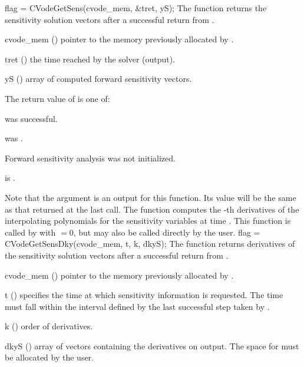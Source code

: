 {
  flag = CVodeGetSens(cvode\_mem, \&tret, yS);
}
{
  The function  returns the sensitivity solution vectors after a
  successful return from .
}
{
  \begin{args}
  \item[cvode\_mem] ()
    pointer to the memory previously allocated by .
  \item[tret] ()
    the time reached by the solver (output).
  \item[yS] ()
    array of computed forward sensitivity vectors.
  \end{args}
}
{
  The return value  of  is one of:
  \begin{args}
  \item[\Id{CV\_SUCCESS}] 
     was successful.
  \item[\Id{CV\_MEM\_NULL}] 
     was .
  \item[\Id{CV\_NO\_SENS}] 
    Forward sensitivity analysis was not initialized.
  \item[\Id{CV\_BAD\_DKY}] 
     is .
  \end{args}
}
{
  Note that the argument  is an output for this function. Its value will be
  the same as that returned at the last  call.
}
The function  computes the -th derivatives of the interpolating 
polynomials for the sensitivity variables at time .
This function is called by  with  $= 0$, but may also be called 
directly by the user.
{
  flag = CVodeGetSensDky(cvode\_mem, t, k, dkyS);
}
{
  The function  returns derivatives of the sensitivity solution 
  vectors after a successful return from .
}
{
  \begin{args}
  \item[cvode\_mem] ()
    pointer to the memory previously allocated by .
  \item[t] ()
    specifies the time at which sensitivity information is 
    requested. The time  must fall within the interval defined by the last 
    successful step taken by {\cvodes}.
  \item[k] () order of derivatives.
  \item[dkyS] ()
    array of  vectors containing the derivatives on output.
    The space for  must be allocated by the user. 
  \end{args}
}
